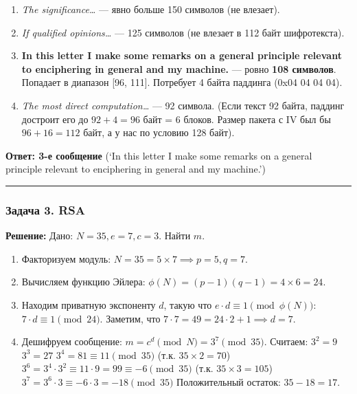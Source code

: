 ﻿\documentclass[9pt,a4paper]{extarticle}
\newcommand{\tightlist}{}
\begin{document}
\begin{enumerate}
\def\labelenumi{\arabic{enumi}.}
\tightlist
\item
  \emph{The significance\ldots{}} --- явно больше 150 символов (не влезает).
\item
  \emph{If qualified opinions\ldots{}} --- 125 символов (не влезает в 112 байт шифротекста).
\item
  \textbf{In this letter I make some remarks on a general principle relevant to enciphering in general and my machine.} --- ровно \textbf{108 символов}. Попадает в диапазон {[}96, 111{]}. Потребует 4 байта паддинга (0x04 04 04 04).
\item
  \emph{The most direct computation\ldots{}} --- 92 символа. (Если текст 92 байта, паддинг достроит его до \(92+4 = 96\) байт = 6 блоков. Размер пакета с IV был бы \(96+16 = 112\) байт, а у нас по условию 128 байт).
\end{enumerate}

\textbf{Ответ: 3-е сообщение} (`In this letter I make some remarks on a general principle relevant to enciphering in general and my machine.')

\begin{center}\rule{0.5\linewidth}{0.5pt}\end{center}

\subsubsection{Задача 3. RSA}\label{ux437ux430ux434ux430ux447ux430-3.-rsa}

\textbf{Решение:} Дано: \(N=35, e=7, c=3\). Найти \(m\).

\begin{enumerate}
\def\labelenumi{\arabic{enumi}.}
\tightlist
\item
  Факторизуем модуль: \(N = 35 = 5 \times 7 \implies p=5, q=7\).
\item
  Вычисляем функцию Эйлера: \(\phi(N) = (p-1)(q-1) = 4 \times 6 = 24\).
\item
  Находим приватную экспоненту \(d\), такую что \(e \cdot d \equiv 1 \pmod{\phi(N)}\): \(7 \cdot d \equiv 1 \pmod{24}\). Заметим, что \(7 \cdot 7 = 49 = 24 \cdot 2 + 1 \implies d = 7\).
\item
  Дешифруем сообщение: \(m = c^d \pmod N = 3^7 \pmod{35}\). Считаем: \(3^2 = 9\) \(3^3 = 27\) \(3^4 = 81 \equiv 11 \pmod{35}\) (т.к. \(35 \times 2 = 70\)) \(3^6 = 3^4 \cdot 3^2 \equiv 11 \cdot 9 = 99 \equiv -6 \pmod{35}\) (т.к. \(35 \times 3 = 105\)) \(3^7 = 3^6 \cdot 3 \equiv -6 \cdot 3 = -18 \pmod{35}\) Положительный остаток: \(35 - 18 = 17\).
\end{enumerate}
\end{document}
